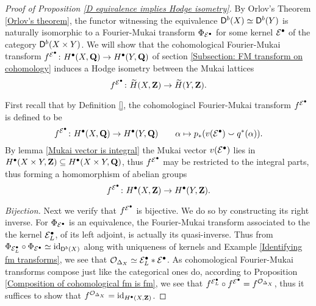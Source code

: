 \begin{proof}[Proof of Proposition \ref{D equivalence implies Hodge isometry}]
    By Orlov's Theorem \ref{Orlov's theorem}, the functor witnessing the equivalence $\mathsf{D}^b(X) \simeq \mathsf{D}^b(Y)$ is naturally isomorphic to a Fourier-Mukai transform $\Phi_{\mathcal E^\bullet}$ for some kernel $\mathcal E^\bullet$ of the category $\mathsf{D}^b(X \times Y)$. We will show that the cohomological Fourier-Mukai transform $f^{\mathcal E^\bullet} \colon H^\bullet(X, \mathbf Q) \to H^\bullet(Y, \mathbf Q)$ of section \ref{Subsection: FM transform on cohomology} induces a Hodge isometry between the Mukai lattices
    \[
        f^{\mathcal E^\bullet} \colon \widetilde{H}(X, \mathbf Z) \to \widetilde{H}(Y, \mathbf Z).
    \]

    First recall that by Definition \ref{}, the cohomologiacl Fourier-Mukai transform $f^{\mathcal E^\bullet}$ is defined to be
    \[
        f^{\mathcal E^\bullet} \colon H^\bullet(X, \mathbf Q) \to H^\bullet(Y, \mathbf Q) \qquad \alpha \mapsto p_*(v(\mathcal E^\bullet) \smallsmile q^*(\alpha)).
    \]
    By lemma \ref{Mukai vector is integral} the Mukai vector $v(\mathcal E^\bullet)$ lies in $H^\bullet(X \times Y, \mathbf Z) \subseteq H^\bullet(X \times Y, \mathbf Q)$, thus $f^{\mathcal E^\bullet}$ may be restricted to the integral parts, thus forming a homomorphism of abelian groups
    \[
        f^{\mathcal E^\bullet} \colon H^\bullet(X, \mathbf Z) \to H^\bullet(Y, \mathbf Z).
    \]

    \noindent
    \textsl{Bijection.}
    Next we verify that $f^{\mathcal E^\bullet}$ is bijective. We do so by constructing its right inverse. For $\Phi_{\mathcal E^\bullet}$ is an equivalence, the Fourier-Mukai transform associated to the the kernel $\mathcal E^\bullet_L$, of its left adjoint, is actually its quasi-inverse. Thus from $\Phi_{\mathcal E^\bullet_L} \circ \Phi_{\mathcal E^\bullet} \simeq \operatorname{id}_{\mathsf{D}^b(X)}$ along with uniqueness of kernels and Example \ref{Identifying fm transforms}, we see that $\mathcal{O}_{\Delta_X} \simeq \mathcal E^\bullet_L * \mathcal E^\bullet$. As cohomological Fourier-Mukai transforms compose just like the categorical ones do, according to Proposition \ref{Composition of cohomological fm is fm}, we see that $f^{\mathcal E^\bullet_L} \circ f^{\mathcal E^\bullet} = f^{\mathcal{O}_{\Delta_X}}$, thus it suffices to show that $f^{\mathcal{O}_{\Delta_X}} = \operatorname{id}_{H^\bullet(X, \mathbf Z)}$.
    

\end{proof}
